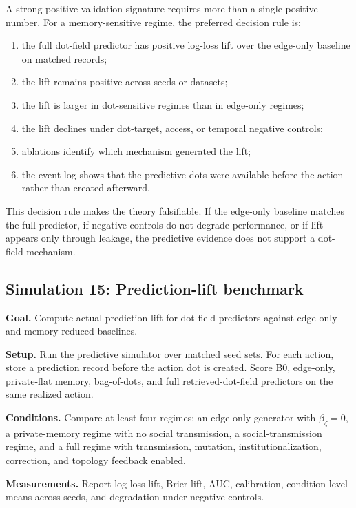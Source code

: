 \documentclass[11pt]{article}
\theoremstyle{remark}
\begin{document}
A strong positive validation signature requires more than a single positive
number. For a memory-sensitive regime, the preferred decision rule is:

\begin{enumerate}[leftmargin=*]
\item the full dot-field predictor has positive log-loss lift over the edge-only
baseline on matched records;
\item the lift remains positive across seeds or datasets;
\item the lift is larger in dot-sensitive regimes than in edge-only regimes;
\item the lift declines under dot-target, access, or temporal negative controls;
\item ablations identify which mechanism generated the lift;
\item the event log shows that the predictive dots were available before the
action rather than created afterward.
\end{enumerate}

This decision rule makes the theory falsifiable. If the edge-only baseline
matches the full predictor, if negative controls do not degrade performance, or
if lift appears only through leakage, the predictive evidence does not support a
dot-field mechanism.

\subsection{Simulation 15: Prediction-lift benchmark}\label{simulation-15-prediction-lift-benchmark}

\textbf{Goal.} Compute actual prediction lift for dot-field predictors against
edge-only and memory-reduced baselines.

\textbf{Setup.} Run the predictive simulator over matched seed sets. For each
action, store a prediction record before the action dot is created. Score B0,
edge-only, private-flat memory, bag-of-dots, and full retrieved-dot-field
predictors on the same realized action.

\textbf{Conditions.} Compare at least four regimes: an edge-only generator with
$\beta_\zeta=0$, a private-memory regime with no social transmission, a
social-transmission regime, and a full regime with transmission, mutation,
institutionalization, correction, and topology feedback enabled.

\textbf{Measurements.} Report log-loss lift, Brier lift, AUC, calibration,
condition-level means across seeds, and degradation under negative controls.
\end{document}
